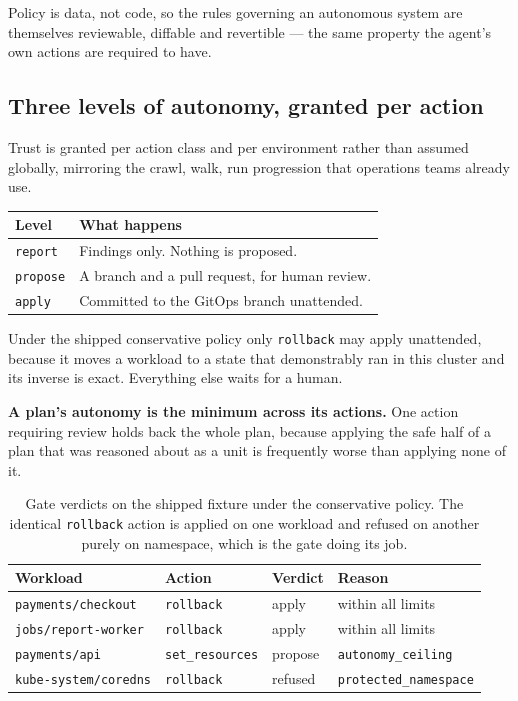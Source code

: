 \documentclass[11pt,a4paper]{article}
\newcommand{\code}[1]{\texttt{\small #1}}
\begin{document}
Policy is data, not code, so the rules governing an autonomous system are
themselves reviewable, diffable and revertible --- the same property the agent's
own actions are required to have.

\subsection{Three levels of autonomy, granted per action}

Trust is granted per action class and per environment rather than assumed
globally, mirroring the crawl, walk, run progression that operations teams
already use.

\begin{table}[h]
\centering
\small
\begin{tabularx}{\textwidth}{@{}l X@{}}
\toprule
\textbf{Level} & \textbf{What happens} \\
\midrule
\code{report}  & Findings only. Nothing is proposed. \\
\code{propose} & A branch and a pull request, for human review. \\
\code{apply}   & Committed to the GitOps branch unattended. \\
\bottomrule
\end{tabularx}
\end{table}

Under the shipped conservative policy only \code{rollback} may apply unattended,
because it moves a workload to a state that demonstrably ran in this cluster and
its inverse is exact. Everything else waits for a human.

\textbf{A plan's autonomy is the minimum across its actions.} One action
requiring review holds back the whole plan, because applying the safe half of a
plan that was reasoned about as a unit is frequently worse than applying none of
it.

\begin{table}[h]
\centering
\small
\begin{tabularx}{\textwidth}{@{}l l l X@{}}
\toprule
\textbf{Workload} & \textbf{Action} & \textbf{Verdict} & \textbf{Reason} \\
\midrule
\code{payments/checkout}    & \code{rollback}       & \textcolor{okgreen}{apply}   & within all limits \\
\code{jobs/report-worker}   & \code{rollback}       & \textcolor{okgreen}{apply}   & within all limits \\
\code{payments/api}         & \code{set\_resources} & \textcolor{warnamber}{propose} & \code{autonomy\_ceiling} \\
\code{kube-system/coredns}  & \code{rollback}       & \textcolor{badred}{refused}  & \code{protected\_namespace} \\
\bottomrule
\end{tabularx}
\caption{Gate verdicts on the shipped fixture under the conservative policy.
The identical \code{rollback} action is applied on one workload and refused on
another purely on namespace, which is the gate doing its job.}
\end{table}
\end{document}
